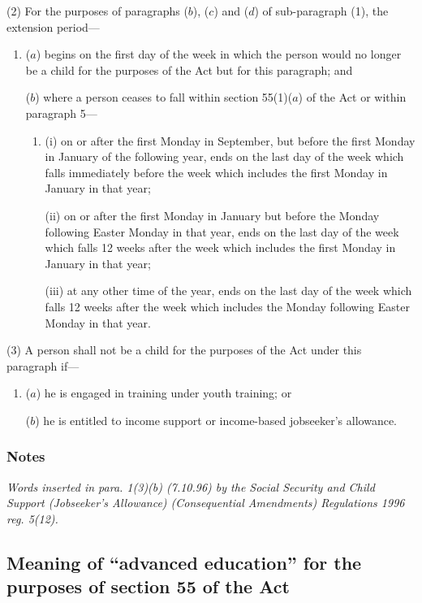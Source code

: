 \documentclass[a4paper]{article}
\newcommand\amendment[1]{\subsubsection*{Notes}{\itshape\frenchspacing\footnotesize #1 \par}}
\begin{document}
(2) For the purposes of paragraphs ($b$), ($c$) and ($d$) of sub-paragraph (1), the extension period—
\begin{enumerate}\item[]
($a$) begins on the first day of the week in which the person would no longer be a child for the purposes of the Act but for this paragraph; and

($b$) where a person ceases to fall within section 55(1)($a$) of the Act or within paragraph 5—
\begin{enumerate}\item[]
(i) on or after the first Monday in September, but before the first Monday in January of the following year, ends on the last day of the week which falls immediately before the week which includes the first Monday in January in that year;

(ii) on or after the first Monday in January but before the Monday following Easter Monday in that year, ends on the last day of the week which falls 12 weeks after the week which includes the first Monday in January in that year;

(iii) at any other time of the year, ends on the last day of the week which falls 12 weeks after the week which includes the Monday following Easter Monday in that year.
\end{enumerate}
\end{enumerate}

(3) A person shall not be a child for the purposes of the Act under this paragraph if—
\begin{enumerate}\item[]
($a$) he is engaged in training under youth training; or

($b$) he is entitled to income support
or income-based jobseeker’s allowance.  %
\end{enumerate}

\amendment{
Words inserted in para. 1(3)(b) (7.10.96) by the Social Security and Child Support (Jobseeker's Allowance) (Consequential Amendments) Regulations 1996 reg. 5(12).
}

\subsection*{Meaning of “advanced education” for the purposes of section 55 of the Act}
\end{document}
